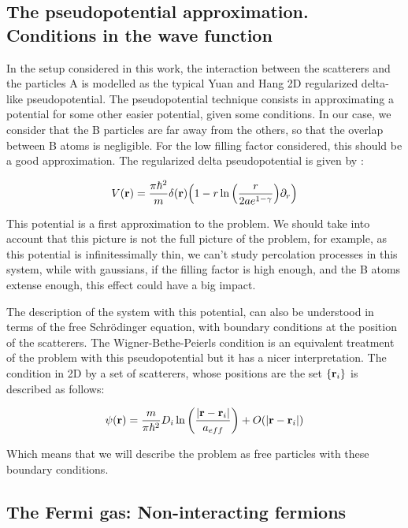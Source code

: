 \subsection{The pseudopotential approximation. Conditions in the wave function}

In the setup considered in this work, the interaction between the scatterers and the particles A is modelled as the typical Yuan and Hang 2D regularized delta-like pseudopotential. The pseudopotential technique consists in approximating a potential for some other easier potential, given some conditions. In our case, we consider that the B particles are far away from the others, so that the overlap between B atoms is negligible. For the low filling factor considered, this should be a good approximation. The regularized delta pseudopotential is given by \cite{farrellSwave2010}:

\begin{equation}
    V(\mathbf{r}) = \frac{\pi\hbar^2}{m}\delta(\vb{r})\qty(1-r\ln{\qty(\frac{r}{2ae^{1-\gamma}})}\partial_{r})
\end{equation}

This potential is a first approximation to the problem. We should take into account that this picture is not the full picture of the problem, for example, as this potential is infinitessimally thin, we can't study percolation processes in this system, while with gaussians, if the filling factor is high enough, and the B atoms extense enough, this effect could have a big impact.

The description of the system with this potential, can also be understood in terms of the free Schrödinger equation, with boundary conditions at the position of the scatterers. The Wigner-Bethe-Peierls condition is an equivalent treatment of the problem with this pseudopotential \cite{betheQuantum1997} but it has a nicer interpretation. The condition in 2D by a set of scatterers, whose positions are the set $\{\vb{r}_i\}$ is described as follows:

\begin{equation} %
    \psi(\vb{r}) = \frac{m}{\pi\hbar ^2}D_i\ln{\qty(\frac{|\vb{r}-\vb{r}_i|}{a_{eff}})}+O(|\vb{r}-\vb{r}_i|)
\end{equation}

Which means that we will describe the problem as free particles with these boundary conditions.

\subsection{The Fermi gas: Non-interacting fermions}

